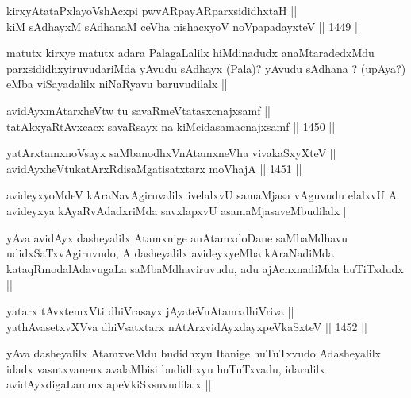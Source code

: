 \begin{shl}
kirxyAtataPxlayoVshAcxpi pwvARpayARparxsididhxtaH ||  \\
kiM sAdhayxM sAdhanaM ceVha nishacxyoV noVpapadayxteV ||  1449 ||  
\end{shl}

\begin{artha}
matutx kirxye matutx adara PalagaLalilx hiMdinadudx anaMtaradedxMdu parxsididhxyiruvudariMda yAvudu sAdhayx (Pala)? yAvudu sAdhana ? (upAya?) eMba viSayadalilx niNaRyavu baruvudilalx ||
\end{artha}


\begin{shl}
avidAyxmAtarxheVtw tu savaRmeVtatasxcnajxsamf || \\
tatAkxyaRtAvxcacx savaRsayx na kiMcidasamacnajxsamf ||  1450 ||  
\end{shl}
				
\begin{shl}
yatArx\s \s tamxnoV\s sayx saMbanodhxV\s nAtamxneVha vivakaSxyXteV || \\
avidAyxheVtukatArxRdisaMgatisatxtarx moVhajA ||  1451 ||  
\end{shl}

\begin{artha}
avideyxyoMdeV kAraNavAgiruvalilx ivelalxvU samaMjasa vAguvudu elalxvU A avideyxya kAyaRvAdadxriMda savxlapxvU asamaMjasaveMbudilalx ||
\end{artha}

\begin{artha}
yAva avidAyx dasheyalilx Atamxnige anAtamxdoDane saMbaMdhavu udidxSaTxvAgiruvudo, A dasheyalilx avideyxyeMba kAraNadiMda kataqRmodalAdavugaLa saMbaMdhaviruvudu, adu ajAcnxnadiMda huTiTxdudx ||
\end{artha}


\begin{shl}
yatarx tAvxtemxVti dhiVrasayx jAyateV\s nAtamxdhiVriva || \\
yathAvasetxvXVva dhiVsatxtarx nAtArxvidAyxdayxpeVkaSxteV ||  1452 ||  
\end{shl}

\begin{artha}
yAva dasheyalilx AtamxveMdu budidhxyu Itanige huTuTxvudo Adasheyalilx idadx vasutxvanenx avalaMbisi budidhxyu huTuTxvadu, idaralilx avidAyxdigaLanunx apeVkiSxsuvudilalx ||
\end{artha}

